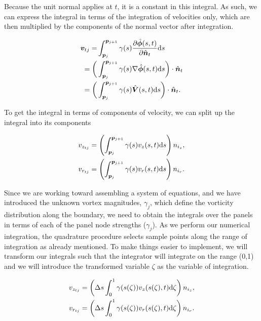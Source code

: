 Because the unit normal applies at \(t\), it is a constant in this integral.
%
As such, we can express the integral in terms of the integration of velocities only, which are then multiplied by the components of the normal vector after integration.

\begin{equation}
    \begin{aligned}
        \bm{v}_{tj} =&\int_{\bm{p}_j}^{\bm{p}_{j+1}} \gamma(s) \frac{\partial \hat{\bm{\phi}}(s,t)}{\partial \hat{\bm{n}}_t} \mathrm{d} s \\
        =\bigg(&\int_{\bm{p}_j}^{\bm{p}_{j+1}} \gamma(s) \nabla \hat{\bm{\phi}}(s,t) \mathrm{d} s\bigg)\cdot \hat{\bm{n}}_t \\
        =\bigg(&\int_{\bm{p}_j}^{\bm{p}_{j+1}} \gamma(s) \hat{\bm{V}}(s,t) \mathrm{d} s\bigg)\cdot \hat{\bm{n}}_t.
    \end{aligned}
\end{equation}

%
To get the integral in terms of components of velocity, we can split up the integral into its components

\begin{subequations}
    \begin{align}
        v_{z_{tj}} &=\left(\int_{\bm{p}_j}^{\bm{p}_{j+1}} \gamma(s) v_z(s,t) \mathrm{d} s \right)n_{i_z},\\
        v_{r_{tj}} &=\left(\int_{\bm{p}_j}^{\bm{p}_{j+1}} \gamma(s) v_r(s,t) \mathrm{d} s\right)n_{i_r}.
    \end{align}
\end{subequations}

Since we are working toward assembling a system of equations, and we have introduced the unknown vortex magnitudes, \(\gamma_j\), which define the vorticity distribution along the boundary, we need to obtain the integrals over the panels in terms of each of the panel node strengths (\(\gamma_j\)).
%
As we perform our numerical integration, the quadrature procedure selects sample points along the range of integration as already mentioned.
%
To make things easier to implement, we will transform our integrals such that the integrator will integrate on the range (0,1) and we will introduce the transformed variable \(\zeta\) as the variable of integration.

\begin{subequations}
    \begin{align}
        v_{z_{tj}} &=\left(\Delta s \int_{0}^{1}\gamma(s(\zeta)) v_z(s(\zeta),t) \mathrm{d} \zeta \right)n_{i_z},\\
        v_{r_{tj}} &=\left(\Delta s \int_{0}^{1}\gamma(s(\zeta)) v_r(s(\zeta),t) \mathrm{d} \zeta \right)n_{i_r}.
    \end{align}
\end{subequations}

